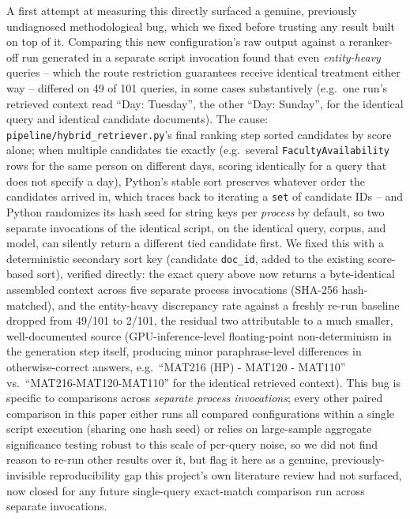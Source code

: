 \documentclass[a4paper,twoside]{article}
\begin{document}
A first attempt at measuring this directly surfaced a genuine, previously undiagnosed methodological bug, which we fixed before trusting any result built on top of it. Comparing this new configuration's raw output against a reranker-off run generated in a separate script invocation found that even \emph{entity-heavy} queries -- which the route restriction guarantees receive identical treatment either way -- differed on 49 of 101 queries, in some cases substantively (e.g.\ one run's retrieved context read ``Day: Tuesday'', the other ``Day: Sunday'', for the identical query and identical candidate documents). The cause: \texttt{pipeline/hybrid\_retriever.py}'s final ranking step sorted candidates by score alone; when multiple candidates tie exactly (e.g.\ several \texttt{FacultyAvailability} rows for the same person on different days, scoring identically for a query that does not specify a day), Python's stable sort preserves whatever order the candidates arrived in, which traces back to iterating a \texttt{set} of candidate IDs -- and Python randomizes its hash seed for string keys per \emph{process} by default, so two separate invocations of the identical script, on the identical query, corpus, and model, can silently return a different tied candidate first. We fixed this with a deterministic secondary sort key (candidate \texttt{doc\_id}, added to the existing score-based sort), verified directly: the exact query above now returns a byte-identical assembled context across five separate process invocations (SHA-256 hash-matched), and the entity-heavy discrepancy rate against a freshly re-run baseline dropped from 49/101 to 2/101, the residual two attributable to a much smaller, well-documented source (GPU-inference-level floating-point non-determinism in the generation step itself, producing minor paraphrase-level differences in otherwise-correct answers, e.g.\ ``MAT216 (HP) - MAT120 - MAT110'' vs.\ ``MAT216-MAT120-MAT110'' for the identical retrieved context). This bug is specific to comparisons across \emph{separate process invocations}; every other paired comparison in this paper either runs all compared configurations within a single script execution (sharing one hash seed) or relies on large-sample aggregate significance testing robust to this scale of per-query noise, so we did not find reason to re-run other results over it, but flag it here as a genuine, previously-invisible reproducibility gap this project's own literature review had not surfaced, now closed for any future single-query exact-match comparison run across separate invocations.
\end{document}
